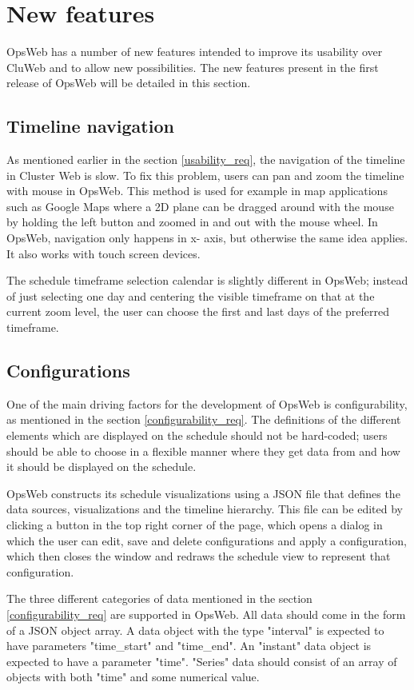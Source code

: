 \section{New features}
OpsWeb has a number of new features intended to improve its usability over CluWeb and to allow new possibilities. The new features present in the first release of OpsWeb will be detailed in this section.

\subsection{Timeline navigation}
As mentioned earlier in the section \ref{usability_req}, the navigation of the timeline in Cluster Web is slow. To fix this problem, users can pan and zoom the timeline with mouse in OpsWeb. This method is used for example in map applications such as Google Maps where a 2D plane can be dragged around with the mouse by holding the left button and zoomed in and out with the mouse wheel. In OpsWeb, navigation only happens in x- axis, but otherwise the same idea applies. It also works with touch screen devices.

The schedule timeframe selection calendar is slightly different in OpsWeb; instead of just selecting one day and centering the visible timeframe on that at the current zoom level, the user can choose the first and last days of the preferred timeframe.

\subsection{Configurations}
One of the main driving factors for the development of OpsWeb is configurability, as mentioned in the section \ref{configurability_req}. The definitions of the different elements which are displayed on the schedule should not be hard-coded; users should be able to choose in a flexible manner where they get data from and how it should be displayed on the schedule.

OpsWeb constructs its schedule visualizations using a JSON file that defines the data sources, visualizations and the timeline hierarchy. This file can be edited by clicking a button in the top right corner of the page, which opens a dialog in which the user can edit, save and delete configurations and apply a configuration, which then closes the window and redraws the schedule view to represent that configuration.

The three different categories of data mentioned in the section \ref{configurability_req} are supported in OpsWeb. All data should come in the form of a JSON object array. A data object with the type "interval" is expected to have parameters "time\_start" and "time\_end". An "instant" data object is expected to have a parameter "time". "Series" data should consist of an array of objects with both "time" and some numerical value.

